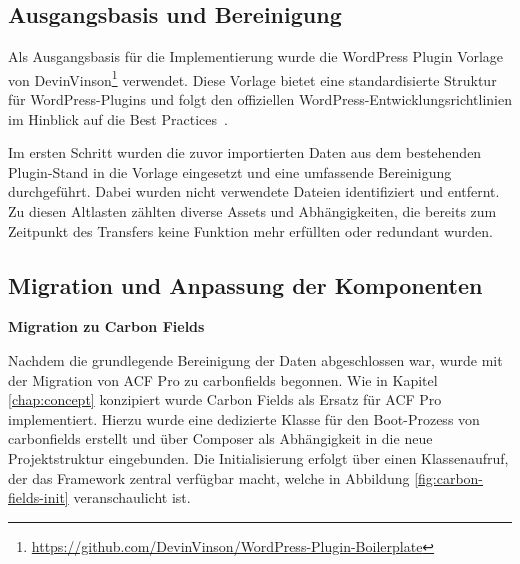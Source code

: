 \subsection{Ausgangsbasis und Bereinigung}

Als Ausgangsbasis für die Implementierung wurde die WordPress Plugin Vorlage von DevinVinson\footnote{\url{https://github.com/DevinVinson/WordPress-Plugin-Boilerplate}} verwendet.
Diese Vorlage bietet eine standardisierte Struktur für WordPress-Plugins und folgt den offiziellen WordPress-Entwicklungsrichtlinien im Hinblick auf die Best Practices~\cite{wordpress2025BSP}.

Im ersten Schritt wurden die zuvor importierten Daten aus dem bestehenden Plugin-Stand in die Vorlage eingesetzt und eine umfassende Bereinigung durchgeführt.
Dabei wurden nicht verwendete Dateien identifiziert und entfernt.
Zu diesen Altlasten zählten diverse Assets und Abhängigkeiten, die bereits zum Zeitpunkt des Transfers keine Funktion mehr erfüllten oder redundant wurden.
\subsection{Migration und Anpassung der Komponenten}
\textbf{Migration zu Carbon Fields}

Nachdem die grundlegende Bereinigung der Daten abgeschlossen war, wurde mit der Migration von ACF Pro zu \gls{carbonfields} begonnen.
Wie in Kapitel \ref{chap:concept} konzipiert wurde Carbon Fields als Ersatz für ACF Pro implementiert.
Hierzu wurde eine dedizierte Klasse für den Boot-Prozess von \gls{carbonfields} erstellt und über Composer als Abhängigkeit in die neue Projektstruktur eingebunden.
Die Initialisierung erfolgt über einen Klassenaufruf, der das Framework zentral verfügbar macht, welche in Abbildung \ref{fig:carbon-fields-init} veranschaulicht ist.


